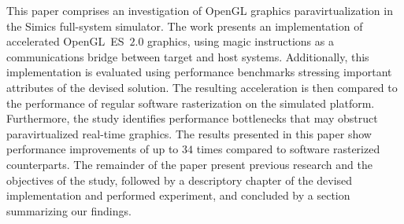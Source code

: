 This paper comprises an investigation of OpenGL graphics paravirtualization in the Simics full-system simulator.
The work presents an implementation of accelerated OpenGL~ES~$2.0$ graphics, using magic instructions as a communications bridge between target and host systems.
Additionally, this implementation is evaluated using performance benchmarks stressing important attributes of the devised solution.
The resulting acceleration is then compared to the performance of regular software rasterization on the simulated platform.
Furthermore, the study identifies performance bottlenecks that may obstruct paravirtualized real-time graphics.
The results presented in this paper show performance improvements of up to $34$ times compared to software rasterized counterparts.
The remainder of the paper present previous research and the objectives of the study, followed by a descriptory chapter of the devised implementation and performed experiment, and concluded by a section summarizing our findings.
